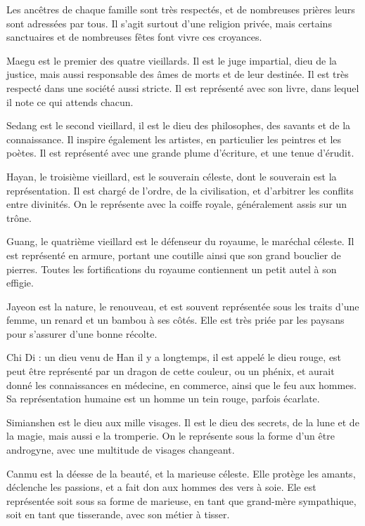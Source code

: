 \documentclass[10pt,a4paper]{book}
\begin{document}
Les ancêtres de chaque famille sont très respectés, et de nombreuses prières leurs sont adressées par tous. Il s'agit surtout d'une religion privée, mais certains sanctuaires et de nombreuses fêtes font vivre ces croyances.

Maegu est le premier des quatre vieillards. Il est le juge impartial, dieu de la justice, mais aussi responsable des âmes de morts et de leur destinée. Il est très respecté dans une société aussi stricte. Il est représenté avec son livre, dans lequel il note ce qui attends chacun.

Sedang est le second vieillard, il est le dieu des philosophes, des savants et de la connaissance. Il inspire également les artistes, en particulier les peintres et les poètes. Il est représenté avec une grande plume d'écriture, et une tenue d'érudit.

Hayan, le troisième vieillard, est le souverain céleste, dont le souverain est la représentation. Il est chargé de l'ordre, de la civilisation, et d'arbitrer les conflits entre divinités. On le représente avec la coiffe royale, généralement assis sur un trône.

Guang, le quatrième vieillard est le défenseur du royaume, le maréchal céleste. Il est représenté en armure, portant une coutille ainsi que son grand bouclier de pierres. Toutes les fortifications du royaume contiennent un petit autel à son effigie. 

Jayeon est la nature, le renouveau, et est souvent représentée sous les traits d'une femme, un renard et un bambou à ses côtés. Elle est très priée par les paysans pour s'assurer d'une bonne récolte.

Chi Di : un dieu venu de Han il y a longtemps, il est appelé le dieu rouge, est peut être représenté par un dragon de cette couleur, ou un phénix, et aurait donné les connaissances en médecine, en commerce, ainsi que le feu aux hommes. Sa représentation humaine est un homme un tein rouge, parfois écarlate.

Simianshen est le dieu aux mille visages. Il est le dieu des secrets, de la lune et de la magie, mais aussi e la tromperie. On le représente sous la forme d'un être androgyne, avec une multitude de visages changeant.

Canmu est la déesse de la beauté, et la marieuse céleste. Elle protège les amants, déclenche les passions, et a fait don aux hommes des vers à soie. Ele est représentée soit sous sa forme de marieuse, en tant que grand-mère sympathique, soit en tant que tisserande, avec son métier à tisser.
\end{document}
